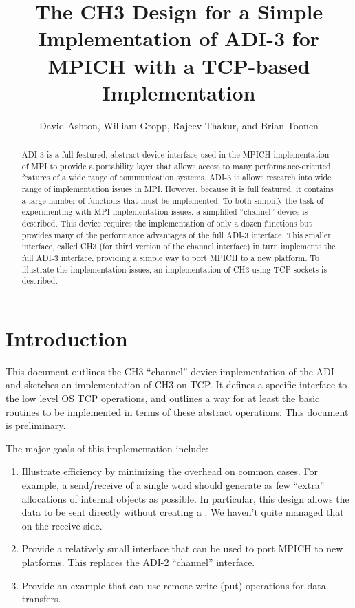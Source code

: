\documentclass{article}
\begin{document}
\title{The CH3 Design for a Simple Implementation of ADI-3 for MPICH with a
TCP-based Implementation}
\author{David Ashton, William Gropp, Rajeev Thakur, and Brian Toonen}
\maketitle

\begin{abstract}
ADI-3 is a full featured, abstract device interface used in the MPICH
implementation of MPI to provide a portability layer that allows
access to many performance-oriented features of a wide range of
communication systems.  ADI-3 is allows research into wide range of
implementation issues in MPI. However, because it is full featured,
it contains a large number of functions that must be implemented.  To
both simplify the task of experimenting with MPI implementation
issues, a simplified ``channel'' device is described.  This device
requires the implementation of only a dozen functions but provides
many of the performance advantages of the full ADI-3 interface.  This
smaller interface, called CH3 (for third version of the channel
interface) in turn implements the full ADI-3 interface, providing a
simple way to port MPICH to a new platform.  To illustrate the
implementation issues, an implementation of CH3 using TCP sockets is
described. 
\end{abstract}

\section{Introduction}
This document outlines the CH3 ``channel'' device implementation of
the ADI and sketches an implementation of CH3 on TCP.  It defines a
specific interface to the low level OS TCP operations, and outlines a way
for at least the basic  routines to be implemented in terms of
these 
abstract operations.  This document is preliminary.

The major goals of this implementation include:
\begin{enumerate}
\item Illustrate efficiency by minimizing the overhead on common cases.
For example, a send/receive of a single word should generate as few ``extra''
allocations of internal objects as possible.  In particular, this
design allows the data to be sent directly without creating a
. We haven't quite managed that on the receive side.

\item Provide a relatively small interface that can be used to port
MPICH to new 
platforms.  This replaces the ADI-2 ``channel'' interface.

\item Provide an example that can use remote write (put) operations for data
transfers.  
\end{enumerate}
\end{document}
